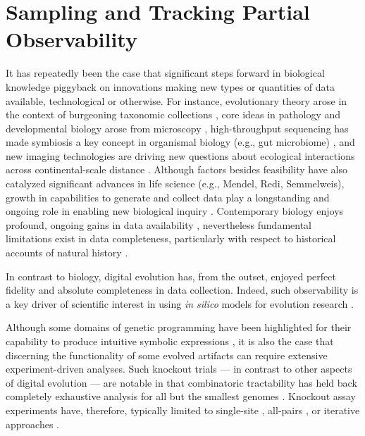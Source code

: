 \section{Sampling and Tracking Partial Observability}

It has repeatedly been the case that significant steps forward in biological knowledge piggyback on innovations making new types or quantities of data available, technological or otherwise.
For instance, evolutionary theory arose in the context of burgeoning taxonomic collections \citep{winsor2009taxonomy}, core ideas in pathology and developmental biology arose from microscopy \citep{turner1890cell}, high-throughput sequencing has made symbiosis a key concept in organismal biology (e.g., gut microbiome) \citep{durack2019gut}, and new imaging technologies are driving new questions about ecological interactions across continental-scale distance \citep{stark2016toward}.
Although factors besides feasibility have also catalyzed significant advances in life science (e.g., Mendel, Redi, Semmelweis), growth in capabilities to generate and collect data play a longstanding and ongoing role in enabling new biological inquiry \citep{strasser2012data}.
Contemporary biology enjoys profound, ongoing gains in data availability \citep{sulston1983embryonic,sheth2017multiplex,weeks2023deep}, nevertheless fundamental limitations exist in data completeness, particularly with respect to historical accounts of natural history \citep{benton2011assessing,delsuc2005phylogenomics}.

In contrast to biology, digital evolution has, from the outset, enjoyed perfect fidelity and absolute completeness in data collection.
Indeed, such observability is a key driver of scientific interest in using \textit{in silico} models for evolution research \citep{o2003digital}.

Although some domains of genetic programming have been highlighted for their capability to produce intuitive symbolic expressions \citep{hu2023genetic,javed2022simplification}, it is also the case that discerning the functionality of some evolved artifacts can require extensive experiment-driven analyses.
Such knockout trials --- in contrast to other aspects of digital evolution --- are notable in that combinatoric tractability has held back completely exhaustive analysis for all but the smallest genomes \citep{nitash2021information}.
Knockout assay experiments have, therefore, typically limited to single-site \citep{adami2006digital}, all-pairs \citep{kumawat2023fluctuating}, or iterative approaches \citep{langdon2014improving,moreno2024case}.

